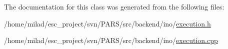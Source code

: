 The documentation for this class was generated from the following files:\begin{DoxyCompactItemize}
\item 
/home/milad/esc\_\-project/svn/PARS/src/backend/ino/\hyperlink{ino_2execution_8h}{execution.h}\item 
/home/milad/esc\_\-project/svn/PARS/src/backend/ino/\hyperlink{ino_2execution_8cpp}{execution.cpp}\end{DoxyCompactItemize}
